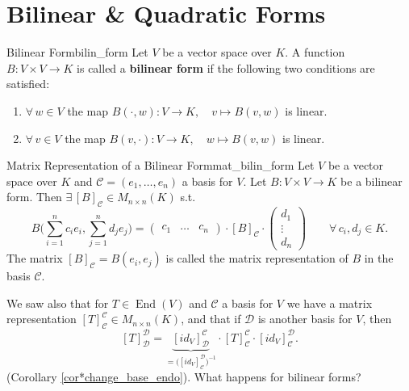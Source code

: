 % 
%
%
%

\section{Bilinear \& Quadratic Forms}
\begin{definition}{Bilinear Form}{bilin_form}
	Let $V$ be a vector space over $K$. A function $B: V \times V \to K$ is called a \textbf{bilinear form} if the following two conditions are satisfied:
	\begin{enumerate}
		\item $\forall \, w \in V$ the map $B(\cdot , w):V \to K, \quad v \mapsto B(v, w)$ is linear.
		\item $\forall \, v \in V$ the map $B(v, \cdot):V \to K, \quad w \mapsto B(v, w)$ is linear.
	\end{enumerate}
\end{definition}

\begin{lemma}{Matrix Representation of a Bilinear Form}{mat_bilin_form}
	Let $V$ be a vector space over $K$ and $\mathcal{C} = (e_1, \hdots , e_n)$ a basis for $V$. Let $B: V \times V \to K$ be a bilinear form. Then $\exists \, [B]_{\mathcal{C}} \in M_{n \times n}(K)$ s.t.
	\[
		B\Big(\sum_{i=1}^{n} c_ie_i, \sum_{j=1}^{n}d_je_j\Big) = 
		\begin{pmatrix}
			c_1 & \hdots & c_n
		\end{pmatrix}
		\cdot [B]_{\mathcal{C}} \cdot
		\begin{pmatrix}
			d_1\\
			\vdots\\
			d_n
		\end{pmatrix} \qquad \forall \, c_i, d_j \in K.
	\]
	The matrix $[B]_{\mathcal{C}} = B(e_i, e_j)$ is called the matrix representation of $B$ in the basis $\mathcal{C}$.
\end{lemma}

We saw also that for $T\in \operatorname{End}(V)$ and $\mathcal{C}$ a basis for $V$ we have a matrix representation $[T]^{\mathcal{C}}_{\mathcal{C}} \in M_{n\times n}(K)$, and that if $\mathcal{D}$ is another basis for $V$, then
\begin{equation}
	\label{eq:trans_mat}
	[T]^{\mathcal{D}}_{\mathcal{D}} = \underbrace{[id_V]^{\mathcal{C}}_{\mathcal{D}}}_{\displaystyle = \big([id_V]^{\mathcal{D}}_{\mathcal{C}}\big)^{-1}} \cdot [T]^{\mathcal{C}}_{\mathcal{C}} \cdot [id_V]^{\mathcal{D}}_{\mathcal{C}}.
\end{equation}
(Corollary \ref{cor*change_base_endo}).
What happens for bilinear forms?

